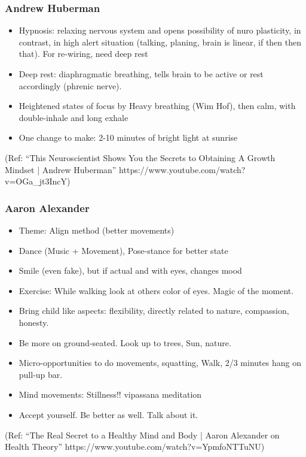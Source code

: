 \begin{frame}[fragile]\frametitle{Andrew Huberman}


	\begin{itemize}

\item  Hypnosis: relaxing nervous system and opens possibility of nuro plasticity, in contrast, in high alert situation (talking, planing, brain is linear, if then then that). For re-wiring, need deep rest
\item  Deep rest: diaphragmatic breathing, tells brain to be active or rest accordingly (phrenic nerve).
\item  Heightened states of focus by Heavy breathing (Wim Hof), then calm, with double-inhale and long exhale
\item  One change to make: 2-10 minutes of bright light at sunrise
\end{itemize}

{\tiny (Ref: ``This Neuroscientist Shows You the Secrets to Obtaining A Growth Mindset | Andrew Huberman'' https://www.youtube.com/watch?v=OGa\_jt3IncY)}


\end{frame}

\begin{frame}[fragile]\frametitle{Aaron Alexander}

\begin{itemize}

\item  Theme: Align method (better movements)
\item  Dance (Music + Movement), Pose-stance for better state
\item  Smile (even fake), but if actual and with eyes, changes mood
\item  Exercise: While walking look at others color of eyes. Magic of the moment.
\item  Bring child like aspects: flexibility, directly related to nature, compassion, honesty.
\item  Be more on ground-seated. Look up to trees, Sun, nature. 
\item  Micro-opportunities to do movements, squatting, Walk, 2/3 minutes hang on pull-up bar.
\item  Mind movements: Stillness!! vipassana meditation
\item  Accept yourself. Be better as well. Talk about it.
\end{itemize}

{\tiny (Ref: ``The Real Secret to a Healthy Mind and Body | Aaron Alexander on Health Theory'' https://www.youtube.com/watch?v=YpmfoNTTuNU)}


\end{frame}

